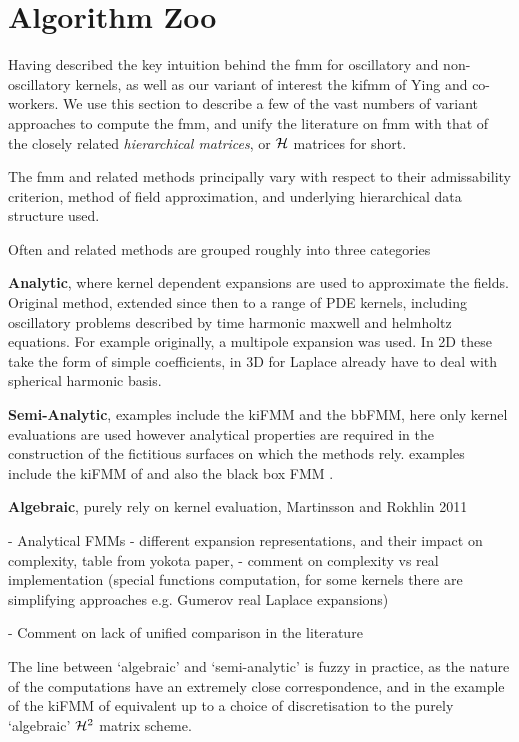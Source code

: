 
\section{Algorithm Zoo}\label{chpt:fmm:sec:algorithm_zoo}

Having described the key intuition behind the \acrshort{fmm} for oscillatory and non-oscillatory kernels, as well as our variant of interest the \acrshort{kifmm} of Ying and co-workers. We use this section to describe a few of the vast numbers of variant approaches to compute the \acrshort{fmm}, and unify the literature on \acrshort{fmm} with that of the closely related \textit{hierarchical matrices}, or $\mathcal{H}$ matrices for short.

The \acrshort{fmm} and related methods principally vary with respect to their admissability criterion, method of field approximation, and underlying hierarchical data structure used.

Often  and related methods are grouped roughly into three categories

\textbf{Analytic}, where kernel dependent expansions are used to approximate the fields. Original method, extended since then to a range of PDE kernels, including oscillatory problems described by time harmonic maxwell and helmholtz equations. For example originally, a multipole expansion was used. In 2D these take the form of simple coefficients, in 3D for Laplace already have to deal with spherical harmonic basis.

\textbf{Semi-Analytic}, examples include the kiFMM and the bbFMM, here only kernel evaluations are used however analytical properties are required in the construction of the fictitious surfaces on which the methods rely. examples include the kiFMM of \cite{Ying:2004:JCP} and also the black box FMM \cite{fong2009black}.

\textbf{Algebraic}, purely rely on kernel evaluation, Martinsson and Rokhlin 2011 \cite{martinsson2007accelerated}

- Analytical FMMs
- different expansion representations, and their impact on complexity, table from yokota paper,
- comment on complexity vs real implementation (special functions computation, for some kernels there are simplifying approaches e.g. Gumerov real Laplace expansions)

- Comment on lack of unified comparison in the literature

The line between `algebraic' and `semi-analytic' is fuzzy in practice, as the nature of the computations have an extremely close correspondence, and in the example of the kiFMM of \cite{Ying:2004:JCP} equivalent up to a choice of discretisation to the purely `algebraic' $\mathcal{H}^2$ matrix scheme.

